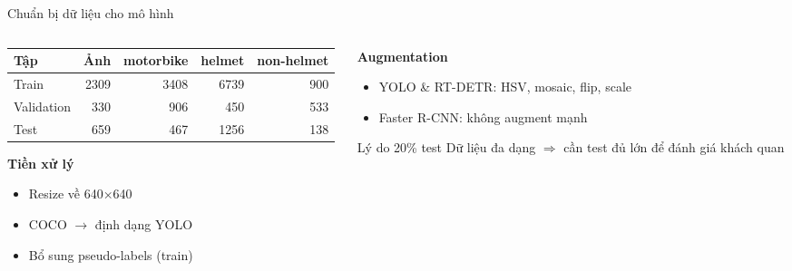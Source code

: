 \begin{frame}{Chuẩn bị dữ liệu cho mô hình}

\begin{columns}[T]
\begin{column}{0.55\textwidth}
  \begin{table}
  \scriptsize
  \begin{tabular}{lrrrr}
    \toprule
    \textbf{Tập} & \textbf{Ảnh} & \textbf{motorbike} & \textbf{helmet} & \textbf{non-helmet} \\
    \midrule
    Train      & 2309 & 3408 & 6739 & 900 \\
    Validation &  330 &  906 &  450 & 533 \\
    Test       &  659 &  467 & 1256 & 138 \\
    \bottomrule
  \end{tabular}
  \end{table}
  \vspace{0.4em}
  \textbf{Tiền xử lý}
  \begin{itemize}
    \item Resize về 640×640
    \item COCO $\to$ định dạng YOLO
    \item Bổ sung pseudo-labels (train)
  \end{itemize}
\end{column}
\begin{column}{0.42\textwidth}
  \textbf{Augmentation}
  \begin{itemize}
    \item YOLO \& RT-DETR: HSV, mosaic, flip, scale
    \item Faster R-CNN: không augment mạnh
  \end{itemize}
  \vspace{0.4em}
  \begin{block}{Lý do 20\% test}
    Dữ liệu đa dạng $\Rightarrow$ cần test đủ lớn để đánh giá khách quan
  \end{block}
\end{column}
\end{columns}

\end{frame}
